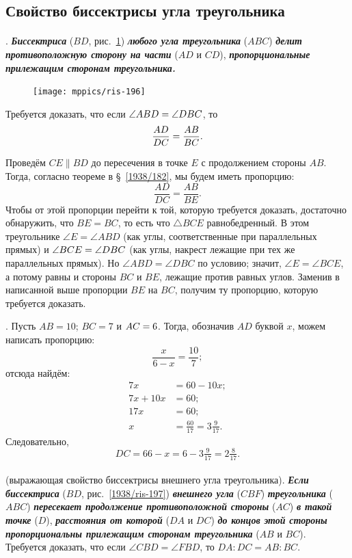 \documentclass[twoside]{book}
\begin{document}
\subsection*{Свойство биссектрисы угла треугольника}

\paragraph{}\label{1938/186}
.
\textbf{\emph{Биссектриса}} ($BD$, рис.~\ref{1938/ris-196}) \textbf{\emph{любого угла треугольника}} ($ABC$) \textbf{\emph{делит противоположную сторону на части}} ($AD$ и $CD$), \textbf{\emph{пропорциональные прилежащим сторонам треугольника.}}

\begin{figure}
\centering
\texttt{[image: mppics/ris-196]}
\caption{}\label{1938/ris-196}
\end{figure}

Требуется доказать, что если $\angle ABD\z=\angle DBC$, то 
\[\frac{AD}{DC}\z=\frac{AB}{BC}.\]

Проведём $CE \parallel BD$ до пересечения в точке $E$ с продолжением стороны $AB$.
Тогда, согласно теореме в §~\ref{1938/182}, мы будем иметь пропорцию:
\[\frac{AD}{DC}=\frac{AB}{BE}.\]
Чтобы от этой пропорции перейти к той, которую требуется доказать, достаточно обнаружить, что $BE=BC$, то есть что $\triangle BCE$ равнобедренный.
В этом треугольнике $\angle E=\angle ABD$ (как углы, соответственные при параллельных прямых) и $\angle BCE \z= \angle DBC$ (как углы, накрест лежащие при тех же параллельных прямых).
Но $\angle ABD=\angle DBC$ по условию;
значит, $\angle E = \angle BCE$, а потому равны и стороны $BC$ и $BE$, лежащие против равных углов.
Заменив в написанной выше пропорции $BE$ на $BC$, получим ту пропорцию, которую требуется доказать.

\medskip

\smallskip
{}.
Пусть $AB = 10$;
$BC = 7$ и $AC \z= 6$.
Тогда, обозначив $AD$ буквой $x$, можем написать пропорцию:
\[\frac{x}{6 - x} = \frac{10}7;\]
отсюда найдём:
\begin{align*}
7x&=60-10x;
\\
7x+10x&=60;
\\
17x&=60;
\\
x&=\tfrac{60}{17}=3\tfrac9{17}.
\end{align*}
Следовательно,
\[DC=66-x=6-3\tfrac9{17}=2\tfrac8{17}.\]

\paragraph{}\label{1938/187}
 (выражающая свойство биссектрисы внешнего угла треугольника).
\textbf{\emph{Если биссектриса}} ($BD$, рис.~\ref{1938/ris-197}) \textbf{\emph{внешнего угла}} ($CBF$) \textbf{\emph{треугольника}} ($ABC$) \textbf{\emph{пересекает продолжение противоположной стороны}} ($AC$) \textbf{\emph{в такой точке}} ($D$), \textbf{\emph{расстояния от которой}} ($DA$ и $DC$) \textbf{\emph{до концов этой стороны пропорциональны прилежащим сторонам треугольника}} ($AB$ и $BC$).
Требуется доказать, что если $\angle CBD=\angle FBD$, то $DA:DC=AB:BC$.
\end{document}
